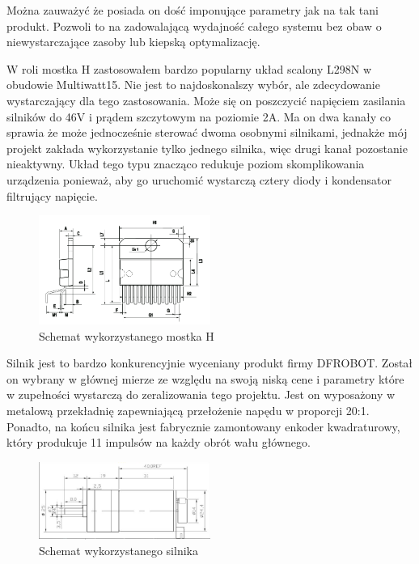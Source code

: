 \documentclass[eng, 11pt]{mgr}
\begin{document}
        Można zauważyć że posiada on dość imponujące parametry 
        jak na tak tani produkt. Pozwoli to na zadowalającą wydajność
        całego systemu bez obaw o niewystarczające zasoby lub 
        kiepską optymalizację.

        W roli mostka H zastosowałem bardzo popularny układ scalony
        L298N w obudowie Multiwatt15. Nie jest to najdoskonalszy wybór,
        ale zdecydowanie wystarczający dla tego zastosowania. 
        Może się on poszczycić napięciem zasilania silników do 46V i 
        prądem szczytowym na poziomie 2A. Ma on dwa kanały co sprawia że
        może jednocześnie sterować dwoma osobnymi silnikami, jednakże
        mój projekt zakłada wykorzystanie tylko jednego silnika, więc 
        drugi kanał pozostanie nieaktywny. Układ tego typu znacząco
        redukuje poziom skomplikowania urządzenia ponieważ, aby
        go uruchomić wystarczą cztery diody i kondensator filtrujący 
        napięcie. \cite{mostek}


        \begin{figure}[ht]
          \centering
          \includegraphics[width=0.5\textwidth]{img/h_bridge.png}
          \caption{Schemat wykorzystanego mostka H}
        \end{figure}


        Silnik jest to bardzo konkurencyjnie wyceniany produkt 
        firmy DFROBOT. Został on wybrany w głównej mierze
        ze względu na swoją niską cene i parametry które w zupełności
        wystarczą do zeralizowania tego projektu.
        Jest on wyposażony w metalową przekładnię zapewniającą
        przełożenie napędu w proporcji 20:1. Ponadto, na końcu
        silnika jest fabrycznie zamontowany enkoder kwadraturowy,
        który produkuje 11 impulsów na każdy obrót wału głównego.
  

        \begin{figure}[ht]
          \centering
          \includegraphics[width=0.5\textwidth]{img/silnik.png}
          \caption{Schemat wykorzystanego silnika}
        \end{figure}
\end{document}
